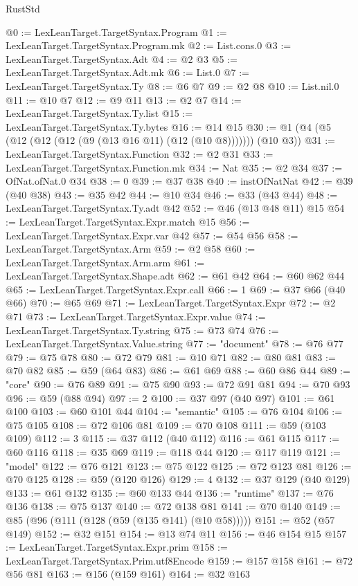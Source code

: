 \begin{lexlean}{RustStd}
\begin{coremodule}
@0 := LexLeanTarget.TargetSyntax.Program
@1 := LexLeanTarget.TargetSyntax.Program.mk
@2 := List.cons.{0}
@3 := LexLeanTarget.TargetSyntax.Adt
@4 := @2 @3
@5 := LexLeanTarget.TargetSyntax.Adt.mk
@6 := List.{0}
@7 := LexLeanTarget.TargetSyntax.Ty
@8 := @6 @7
@9 := @2 @8
@10 := List.nil.{0}
@11 := @10 @7
@12 := @9 @11
@13 := @2 @7
@14 := LexLeanTarget.TargetSyntax.Ty.list
@15 := LexLeanTarget.TargetSyntax.Ty.bytes
@16 := @14 @15
@30 := @1 (@4 (@5 (@12 (@12 (@12 (@9 (@13 @16 @11) (@12 (@10 @8))))))) (@10 @3))
@31 := LexLeanTarget.TargetSyntax.Function
@32 := @2 @31
@33 := LexLeanTarget.TargetSyntax.Function.mk
@34 := Nat
@35 := @2 @34
@37 := OfNat.ofNat.{0} @34
@38 := 0
@39 := @37 @38
@40 := instOfNatNat
@42 := @39 (@40 @38)
@43 := @35 @42
@44 := @10 @34
@46 := @33 (@43 @44)
@48 := LexLeanTarget.TargetSyntax.Ty.adt @42
@52 := @46 (@13 @48 @11) @15
@54 := LexLeanTarget.TargetSyntax.Expr.match @15
@56 := LexLeanTarget.TargetSyntax.Expr.var @42
@57 := @54 @56
@58 := LexLeanTarget.TargetSyntax.Arm
@59 := @2 @58
@60 := LexLeanTarget.TargetSyntax.Arm.arm
@61 := LexLeanTarget.TargetSyntax.Shape.adt
@62 := @61 @42
@64 := @60 @62 @44
@65 := LexLeanTarget.TargetSyntax.Expr.call
@66 := 1
@69 := @37 @66 (@40 @66)
@70 := @65 @69
@71 := LexLeanTarget.TargetSyntax.Expr
@72 := @2 @71
@73 := LexLeanTarget.TargetSyntax.Expr.value
@74 := LexLeanTarget.TargetSyntax.Ty.string
@75 := @73 @74
@76 := LexLeanTarget.TargetSyntax.Value.string
@77 := "document"
@78 := @76 @77
@79 := @75 @78
@80 := @72 @79
@81 := @10 @71
@82 := @80 @81
@83 := @70 @82
@85 := @59 (@64 @83)
@86 := @61 @69
@88 := @60 @86 @44
@89 := "core"
@90 := @76 @89
@91 := @75 @90
@93 := @72 @91 @81
@94 := @70 @93
@96 := @59 (@88 @94)
@97 := 2
@100 := @37 @97 (@40 @97)
@101 := @61 @100
@103 := @60 @101 @44
@104 := "semantic"
@105 := @76 @104
@106 := @75 @105
@108 := @72 @106 @81
@109 := @70 @108
@111 := @59 (@103 @109)
@112 := 3
@115 := @37 @112 (@40 @112)
@116 := @61 @115
@117 := @60 @116
@118 := @35 @69
@119 := @118 @44
@120 := @117 @119
@121 := "model"
@122 := @76 @121
@123 := @75 @122
@125 := @72 @123 @81
@126 := @70 @125
@128 := @59 (@120 @126)
@129 := 4
@132 := @37 @129 (@40 @129)
@133 := @61 @132
@135 := @60 @133 @44
@136 := "runtime"
@137 := @76 @136
@138 := @75 @137
@140 := @72 @138 @81
@141 := @70 @140
@149 := @85 (@96 (@111 (@128 (@59 (@135 @141) (@10 @58)))))
@151 := @52 (@57 @149)
@152 := @32 @151
@154 := @13 @74 @11
@156 := @46 @154 @15
@157 := LexLeanTarget.TargetSyntax.Expr.prim
@158 := LexLeanTarget.TargetSyntax.Prim.utf8Encode
@159 := @157 @158
@161 := @72 @56 @81
@163 := @156 (@159 @161)
@164 := @32 @163

\end{coremodule}
\end{lexlean}
